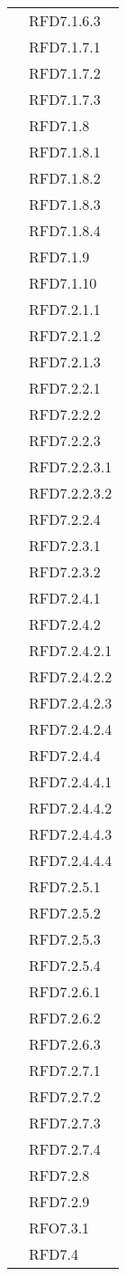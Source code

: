 \begin{longtable}{|>{\centering}m{10cm}|m{3cm}<{\centering}|}
& RFD7.1.6.3\\
& RFD7.1.7.1\\
& RFD7.1.7.2\\
& RFD7.1.7.3\\
& RFD7.1.8\\
& RFD7.1.8.1\\
& RFD7.1.8.2\\
& RFD7.1.8.3\\
& RFD7.1.8.4\\
& RFD7.1.9\\
& RFD7.1.10\\
& RFD7.2.1.1\\
& RFD7.2.1.2\\
& RFD7.2.1.3\\
& RFD7.2.2.1\\
& RFD7.2.2.2\\
& RFD7.2.2.3\\
& RFD7.2.2.3.1\\
& RFD7.2.2.3.2\\
& RFD7.2.2.4\\
& RFD7.2.3.1\\
& RFD7.2.3.2\\
& RFD7.2.4.1\\
& RFD7.2.4.2\\
& RFD7.2.4.2.1\\
& RFD7.2.4.2.2\\
& RFD7.2.4.2.3\\
& RFD7.2.4.2.4\\
& RFD7.2.4.4\\
& RFD7.2.4.4.1\\
& RFD7.2.4.4.2\\
& RFD7.2.4.4.3\\
& RFD7.2.4.4.4\\
& RFD7.2.5.1\\
& RFD7.2.5.2\\
& RFD7.2.5.3\\
& RFD7.2.5.4\\
& RFD7.2.6.1\\
& RFD7.2.6.2\\
& RFD7.2.6.3\\
& RFD7.2.7.1\\
& RFD7.2.7.2\\
& RFD7.2.7.3\\
& RFD7.2.7.4\\
& RFD7.2.8\\
& RFD7.2.9\\
& RFO7.3.1\\
& RFD7.4\\

\end{longtable}
